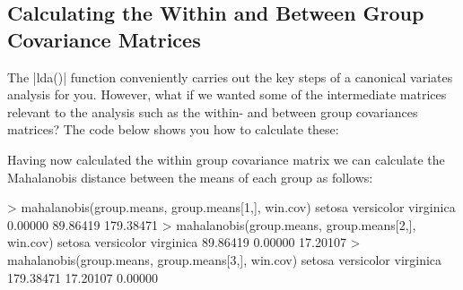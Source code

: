 \subsection{Calculating the Within and Between Group Covariance Matrices}

The |lda()| function conveniently carries out the key steps of a canonical variates analysis for you.  However, what if we wanted some of the intermediate matrices relevant to the analysis such as the within- and between group covariances matrices? The code below shows you how to calculate these:


Having now calculated the within group covariance matrix we can calculate the Mahalanobis distance between the means of each group as follows:

\begin{R}
> mahalanobis(group.means, group.means[1,], win.cov)
    setosa versicolor  virginica
   0.00000   89.86419  179.38471
> mahalanobis(group.means, group.means[2,], win.cov)
    setosa versicolor  virginica
  89.86419    0.00000   17.20107
> mahalanobis(group.means, group.means[3,], win.cov)
    setosa versicolor  virginica
 179.38471   17.20107    0.00000
\end{R}

